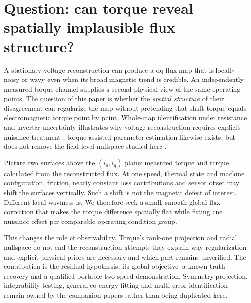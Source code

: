 
\section{Question: can torque reveal spatially implausible flux structure?}
A stationary voltage reconstruction can produce a dq flux map that is locally
noisy or wavy even when its broad magnetic trend is credible. An independently
measured torque channel supplies a second physical view of the same operating
points. The question of this paper is whether the \emph{spatial structure} of
their disagreement can regularize the map without pretending that shaft torque
equals electromagnetic torque point by point. Whole-map identification under
resistance and inverter uncertainty illustrates why voltage reconstruction
requires explicit nuisance treatment \cite{liu2018fluxmap}; torque-assisted
parameter estimation likewise exists, but does not remove the field-level
nullspace studied here \cite{wang2026torque}.

Picture two surfaces above the $(i_d,i_q)$ plane: measured torque and torque
calculated from the reconstructed flux. At one speed, thermal state and machine
configuration, friction, nearly constant loss contributions and sensor offset
may shift the surfaces vertically. Such a shift is not the magnetic defect of
interest. Different local waviness is. We therefore seek a small, smooth global
flux correction that makes the torque difference spatially flat while fitting
one nuisance offset per comparable operating-condition group.

This changes the role of observability. Torque's rank-one projection and radial
nullspace do not end the reconstruction attempt; they explain why regularization
and explicit physical priors are necessary and which part remains unverified.
The contribution is the residual hypothesis, its global objective, a known-truth
recovery and a qualified portable two-speed demonstration. Symmetry projection,
integrability testing, general co-energy fitting and multi-error identification
remain owned by the companion papers rather than being duplicated here.
